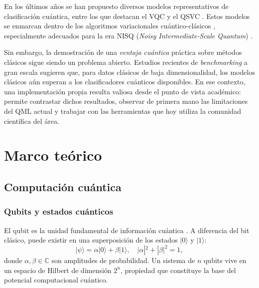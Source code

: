 \documentclass[a4paper,10pt,twocolumn]{article}
\begin{document}
En los \'ultimos a\~nos se han propuesto diversos modelos representativos
de clasificaci\'on cu\'antica, entre los que destacan el VQC
\citep{havlicek2019} y el QSVC \citep{rebentrost2014}. Estos modelos se
enmarcan dentro de los algoritmos variacionales cu\'antico-cl\'asicos
\citep{cerezo2021}, especialmente adecuados para la era NISQ
(\textit{Noisy Intermediate-Scale Quantum}) \citep{preskill2018}.

Sin embargo, la demostraci\'on de una \emph{ventaja cu\'antica} pr\'actica
sobre m\'etodos cl\'asicos sigue siendo un problema abierto. Estudios
recientes de \emph{benchmarking} a gran escala \citep{bowles2024,
schnabel2024} sugieren que, para datos cl\'asicos de baja
dimensionalidad, los modelos cl\'asicos a\'un superan a los
clasificadores cu\'anticos disponibles. En ese contexto, una
implementaci\'on propia resulta valiosa desde el punto de vista
acad\'emico: permite contrastar dichos resultados, observar de primera
mano las limitaciones del QML actual y trabajar con las herramientas
que hoy utiliza la comunidad cient\'ifica del \'area.

\section{Marco te\'orico}

\subsection{Computaci\'on cu\'antica}

\subsubsection{Qubits y estados cu\'anticos}
El qubit es la unidad fundamental de informaci\'on cu\'antica
\citep{nielsen2010}. A diferencia del bit cl\'asico, puede existir en
una superposici\'on de los estados $|0\rangle$ y $|1\rangle$:
\begin{equation}
|\psi\rangle = \alpha|0\rangle + \beta|1\rangle,
\quad |\alpha|^2 + |\beta|^2 = 1,
\end{equation}
donde $\alpha, \beta \in \mathbb{C}$ son amplitudes de probabilidad. Un
sistema de $n$ qubits vive en un espacio de Hilbert de dimensi\'on
$2^n$, propiedad que constituye la base del potencial computacional
cu\'antico.
\end{document}
